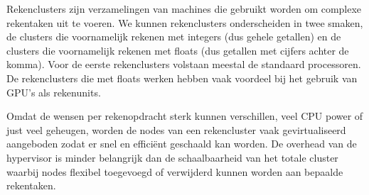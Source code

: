 Rekenclusters zijn verzamelingen van machines die gebruikt worden om complexe rekentaken uit te voeren. We kunnen rekenclusters onderscheiden in twee smaken, de clusters die voornamelijk rekenen met integers (dus gehele getallen) en de clusters die voornamelijk rekenen met floats (dus getallen met cijfers achter de komma). Voor de eerste rekenclusters volstaan meestal de standaard processoren. De rekenclusters die met floats werken hebben vaak voordeel bij het gebruik van GPU's als rekenunits.

Omdat de wensen per rekenopdracht sterk kunnen verschillen, veel CPU power of just veel geheugen, worden de nodes van een rekencluster vaak gevirtualiseerd aangeboden zodat er snel en effici\"ent geschaald kan worden. De overhead van de hypervisor is minder belangrijk dan de schaalbaarheid van het totale cluster waarbij nodes flexibel toegevoegd of verwijderd kunnen worden aan bepaalde rekentaken.
